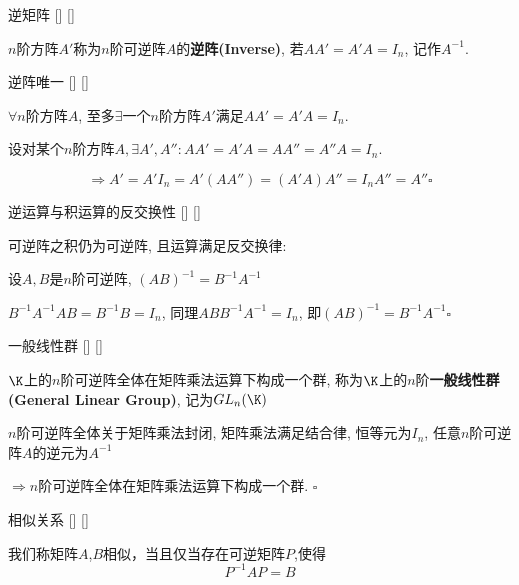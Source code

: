 \documentclass[UTF8]{ctexart}
\begin{document}
		\begin{dfn}
			[]
			{逆矩阵}
			[]
			[]

			$n$阶方阵$A'$称为$n$阶可逆阵$A$的\textbf{逆阵(Inverse)}, 若$AA'=A'A=I_n$, 记作$A^{-1}$. 
		\end{dfn}
		
		\begin{ppt}
			[]
			{逆阵唯一}
			[]
			[]
		
			$\forall n$阶方阵$A$, 至多$\exists$一个$n$阶方阵$A'$满足$AA'=A'A=I_n$. 
		\end{ppt}

        \begin{prf}
			设对某个$n$阶方阵$A, \exists A',A'': AA'=A'A=AA''=A''A=I_n$. 
			
			$$\Longrightarrow A'=A'I_n=A'(AA'')=(A'A)A''=I_nA''=A''\square$$
	    \end{prf}
 
		\begin{ppt}
			[]
			{逆运算与积运算的反交换性}
			[]
			[]

			可逆阵之积仍为可逆阵, 且运算满足反交换律: 
			
			设$A,B$是$n$阶可逆阵, $(AB)^{-1}=B^{-1}A^{-1}$
		\end{ppt}
  
		\begin{prf}
            $B^{-1}A^{-1}AB=B^{-1}B=I_n$, 同理$ABB^{-1}A^{-1}=I_n$, 即$(AB)^{-1}=B^{-1}A^{-1}\square$
		\end{prf}
		
		
		\begin{ppt}
			[]
			{一般线性群}
			[]
			[]

			$\K$上的$n$阶可逆阵全体在矩阵乘法运算下构成一个群, 称为$\K$上的$n$阶\textbf{一般线性群(General Linear Group)}, 记为$GL_n(\K)$
		\end{ppt}
  
		\begin{prf}
			 $n$阶可逆阵全体关于矩阵乘法封闭, 矩阵乘法满足结合律, 恒等元为$I_n$, 任意$n$阶可逆阵$A$的逆元为$A^{-1}$
			
			$\Longrightarrow n$阶可逆阵全体在矩阵乘法运算下构成一个群. $\square$
        \end{prf}
        
		\begin{dfn}
			[]
			{相似关系}
			[]
			[]
  
            我们称矩阵$A$,$B$相似，当且仅当存在可逆矩阵$P$,使得
            \[P^{-1}AP=B\]

		\end{dfn}
		
\end{document}
